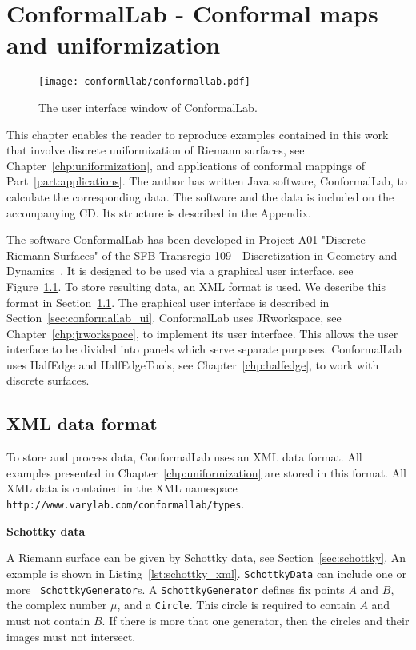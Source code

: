 \documentclass[Thesis.tex]{subfiles}
\begin{document}
\chapter{{\sc ConformalLab} - Conformal maps and uniformization}
\label{chp:conformallab}

\begin{figure}
\centering
\texttt{[image: conformllab/conformallab.pdf]}
\caption{The user interface window of {\sc ConformalLab}.}
\label{fig:conformal_window}
\end{figure}

This chapter enables the reader to reproduce examples contained in this work
that involve discrete uniformization of Riemann surfaces, see
Chapter~\ref{chp:uniformization}, and applications of conformal mappings of
Part~\ref{part:applications}. The author has written {\sc Java} software, {\sc
ConformalLab}, to calculate the corresponding data.  The software and the data
is included on the accompanying CD. Its structure is described in the Appendix. 

The software {\sc ConformalLab} has been developed in Project A01 "Discrete Riemann Surfaces" of the SFB Transregio 109 - Discretization in Geometry and Dynamics~\cite{sfb-webpage}.
It is designed to be used via a graphical user interface, see
Figure~\ref{fig:conformal_window}. To store resulting data, an XML format is
used. We describe this format in Section~\ref{sec:conformal_data}. The
graphical user interface is described in Section~\ref{sec:conformallab_ui}.
{\sc ConformalLab} uses {\sc JRworkspace}, see Chapter~\ref{chp:jrworkspace},
to implement its user interface. This allows the user interface to be divided
into panels which serve separate purposes.  {\sc ConformalLab} uses {\sc
HalfEdge} and {\sc HalfEdgeTools}, see Chapter~\ref{chp:halfedge}, to work with
discrete surfaces.


\section{XML data format}
\label{sec:conformal_data}
To store and process data, {\sc ConformalLab} uses an {\sc XML} data format.
All examples presented in Chapter~\ref{chp:uniformization} are stored in
this format.  All XML data is contained in the XML namespace {\tt
http://www.varylab.com/conformallab/types}.


{\bf Schottky data} 

A Riemann surface can be given by Schottky data, see Section~\ref{sec:schottky}. 
An example is shown in
Listing~\ref{lst:schottky_xml}. {\tt SchottkyData} can include one or more {\tt
SchottkyGenerator}s. A {\tt SchottkyGenerator} defines fix points $A$ and
$B$, the complex number $\mu$, and a {\tt Circle}. This circle is required to
contain $A$ and must not contain $B$. If there is more that one generator,
then the circles and their images must not intersect.
\end{document}
